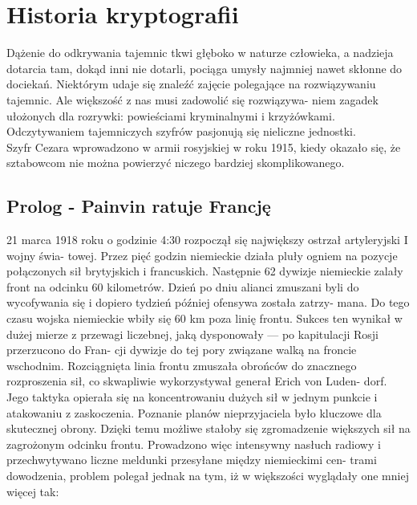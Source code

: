 \documentclass[a4paper]{article}
\begin{document}
\section{Historia kryptografii}
Dążenie do odkrywania tajemnic tkwi głęboko w naturze człowieka, a nadzieja dotarcia tam, dokąd
inni nie dotarli, pociąga umysły najmniej nawet skłonne do dociekań. Niektórym udaje się znaleźć
zajęcie polegające na rozwiązywaniu tajemnic. Ale większość z nas musi zadowolić się rozwiązywa-
niem zagadek ułożonych dla rozrywki: powieściami kryminalnymi i krzyżówkami. Odczytywaniem
tajemniczych szyfrów pasjonują się nieliczne jednostki.\\
Szyfr Cezara wprowadzono w armii rosyjskiej w roku 1915, kiedy okazało się, że sztabowcom nie
można powierzyć niczego bardziej skomplikowanego.
\subsection{Prolog - Painvin ratuje Francję}
21 marca 1918 roku o godzinie 4:30 rozpoczął się największy ostrzał artyleryjski I wojny świa-
towej. Przez pięć godzin niemieckie działa pluły ogniem na pozycje połączonych sił brytyjskich
i francuskich. Następnie 62 dywizje niemieckie zalały front na odcinku 60 kilometrów. Dzień po
dniu alianci zmuszani byli do wycofywania się i dopiero tydzień później ofensywa została zatrzy-
mana. Do tego czasu wojska niemieckie wbiły się 60 km poza linię frontu. Sukces ten wynikał w
dużej mierze z przewagi liczebnej, jaką dysponowały — po kapitulacji Rosji przerzucono do Fran-
cji dywizje do tej pory związane walką na froncie wschodnim. Rozciągnięta linia frontu zmuszała
obrońców do znacznego rozproszenia sił, co skwapliwie wykorzystywał generał Erich von Luden-
dorf. Jego taktyka opierała się na koncentrowaniu dużych sił w jednym punkcie i atakowaniu z
zaskoczenia. Poznanie planów nieprzyjaciela było kluczowe dla skutecznej obrony. Dzięki temu
możliwe stałoby się zgromadzenie większych sił na zagrożonym odcinku frontu. Prowadzono więc
intensywny nasłuch radiowy i przechwytywano liczne meldunki przesyłane między niemieckimi cen-
trami dowodzenia, problem polegał jednak na tym, iż w większości wyglądały one mniej więcej tak:\\
\end{document}
